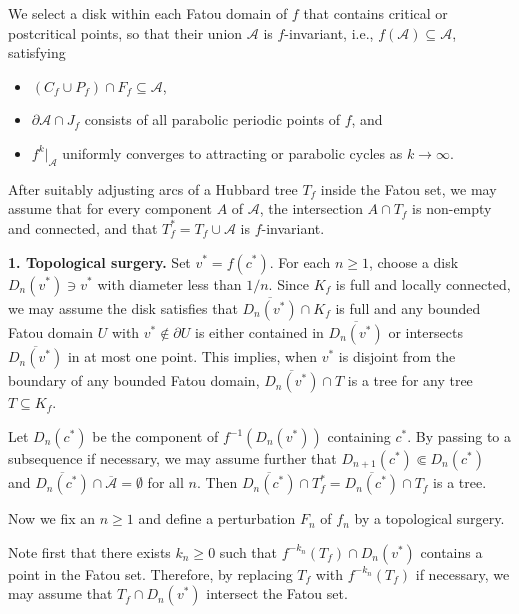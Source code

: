 \documentclass[a4paper,reqno,times, 11pt]{amsart}
\theoremstyle{remark}
\theoremstyle{plain}
\numberwithin{equation}{section}
\def\AAA{{\cal A}}
\def\cal{\mathcal}
\begin{document}
We select a disk within each Fatou domain of $f$ that contains critical or postcritical points, so that their union $\mathcal{A}$ is $f$-invariant, i.e., $f(\mathcal{A})\subseteq \mathcal{A}$, satisfying
\begin{itemize}
\item  $(C_f \cup P_f) \cap F_f\subseteq \AAA$,  
\item $\partial\AAA\cap J_f$ consists of all parabolic periodic points of $f$, and
\item $f^k|_\AAA$ uniformly converges to attracting or parabolic cycles as $k\to\infty$.
\end{itemize}
After suitably adjusting arcs of a Hubbard tree $T_f$ inside the Fatou set, we may assume that for every component $A$ of $\mathcal{A}$, the intersection $A \cap T_f$ is non-empty and connected, and that $T_f^* = T_f \cup \mathcal{A}$ is $f$-invariant. \vspace{5pt}%
		
		
		
		
		
{\bf 1. Topological surgery.}
		\vspace{5pt}
Set $v^*=f(c^*)$. For each $n\geq1$, choose a disk $D_{n}(v^*)\ni v^*$ with diameter less than $1/n$. Since $K_f$ is full and locally connected, we may assume the disk satisfies that $\overline{D_n(v^*)}\cap K_f$ is full and any bounded Fatou domain $U$ with $v^*\notin \partial U$ is either contained in $\overline{D_n(v^*)}$ or intersects $\overline{D_n(v^*)}$ in at most one point.
This implies, when $v^*$ is disjoint from the boundary of any bounded Fatou domain, $\overline{D_n(v^*)}\cap T$ is a tree for any tree $T\subseteq K_f$.

Let $D_n(c^*)$ be the component of $f^{-1}(D_n(v^*))$ containing $c^*$. By passing to a subsequence if necessary, we may assume further that  $D_{n+1}(c^*)\Subset D_n(c^*)$ and $\overline{D_n(c^*)}\cap\overline{\AAA}=\emptyset$ for all $n$. Then $\overline{D_n(c^*)}\cap T_f^*=\overline{D_n(c^*)}\cap T_f$ is a tree.\vspace{1pt}
		
	Now we fix an $n\geq1$ and define a perturbation $F_n$ of $f_n$ by a topological surgery.\vspace{1pt}
	
	Note first that there exists $k_n\geq0$ such that $f^{-k_n}(T_f)\cap D_n(v^*)$ contains a point in the Fatou set. Therefore, by replacing $T_f$ with $f^{-k_n}(T_f)$ if necessary, we may assume that $T_f\cap D_n(v^*)$ intersect the Fatou set.
	
\end{document}
